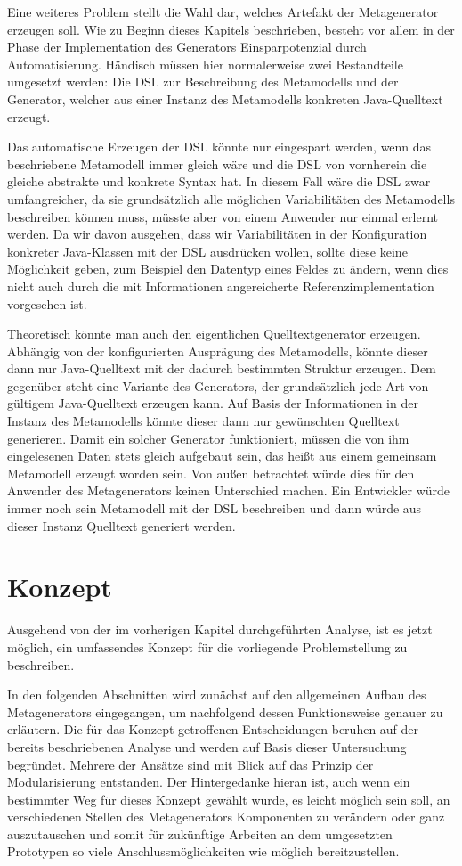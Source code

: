 \documentclass[12pt,oneside,a4paper,parskip]{scrbook}
\begin{document}
Eine weiteres Problem stellt die Wahl dar, welches Artefakt der Metagenerator erzeugen soll. Wie zu Beginn dieses Kapitels beschrieben, besteht vor allem in der Phase der Implementation des Generators Einsparpotenzial durch Automatisierung. Händisch müssen hier normalerweise zwei Bestandteile umgesetzt werden: Die DSL zur Beschreibung des Metamodells und der Generator, welcher aus einer Instanz des Metamodells konkreten Java-Quelltext erzeugt.

Das automatische Erzeugen der DSL könnte nur eingespart werden, wenn das beschriebene Metamodell immer gleich wäre und die DSL von vornherein die gleiche abstrakte und konkrete Syntax hat. In diesem Fall wäre die DSL zwar umfangreicher, da sie grundsätzlich alle möglichen Variabilitäten des Metamodells beschreiben können muss, müsste aber von einem Anwender nur einmal erlernt werden. Da wir davon ausgehen, dass wir Variabilitäten in der Konfiguration konkreter Java-Klassen mit der DSL ausdrücken wollen, sollte diese keine Möglichkeit geben, zum Beispiel den Datentyp eines Feldes zu ändern, wenn dies nicht auch durch die mit Informationen angereicherte Referenzimplementation vorgesehen ist.

Theoretisch könnte man auch den eigentlichen Quelltextgenerator erzeugen. Abhängig von der konfigurierten Ausprägung des Metamodells, könnte dieser dann nur Java-Quelltext mit der dadurch bestimmten Struktur erzeugen. Dem gegenüber steht eine Variante des Generators, der grundsätzlich jede Art von gültigem Java-Quelltext erzeugen kann. Auf Basis der Informationen in der Instanz des Metamodells könnte dieser dann nur gewünschten Quelltext generieren. Damit ein solcher Generator funktioniert, müssen die von ihm eingelesenen Daten stets gleich aufgebaut sein, das heißt aus einem gemeinsam Metamodell erzeugt worden sein. Von außen betrachtet würde dies für den Anwender des Metagenerators keinen Unterschied machen. Ein Entwickler würde immer noch sein Metamodell mit der DSL beschreiben und dann würde aus dieser Instanz Quelltext generiert werden.

\chapter{Konzept}

Ausgehend von der im vorherigen Kapitel durchgeführten Analyse, ist es jetzt möglich, ein umfassendes Konzept für die vorliegende Problemstellung zu beschreiben.

In den folgenden Abschnitten wird zunächst auf den allgemeinen Aufbau des Metagenerators eingegangen, um nachfolgend dessen Funktionsweise genauer zu erläutern. Die für das Konzept getroffenen Entscheidungen beruhen auf der bereits beschriebenen Analyse und werden auf Basis dieser Untersuchung begründet. Mehrere der Ansätze sind mit Blick auf das Prinzip der Modularisierung entstanden. Der Hintergedanke hieran ist, auch wenn ein bestimmter Weg für dieses Konzept gewählt wurde, es leicht möglich sein soll, an verschiedenen Stellen des Metagenerators Komponenten zu verändern oder ganz auszutauschen und somit für zukünftige Arbeiten an dem umgesetzten Prototypen so viele Anschlussmöglichkeiten wie möglich bereitzustellen.
\end{document}
